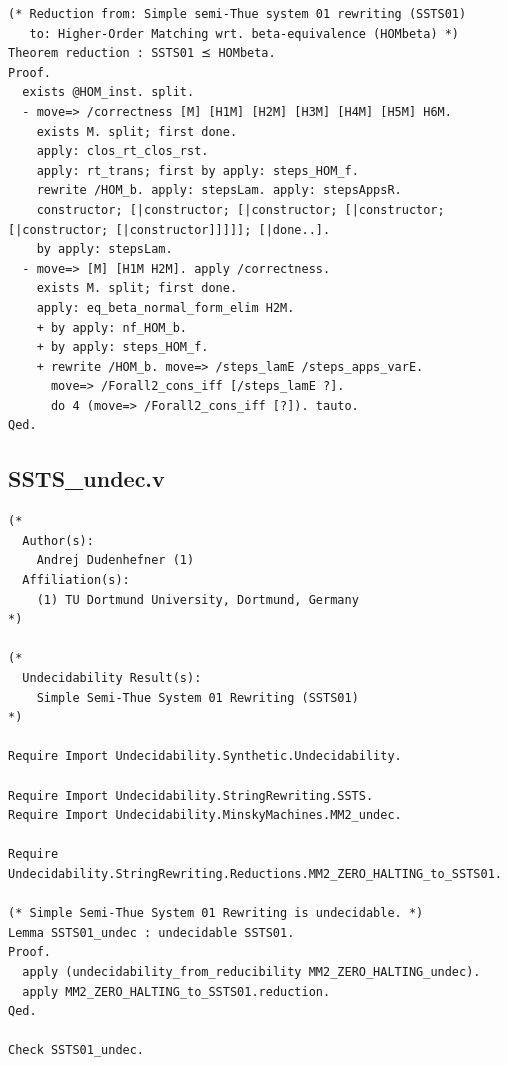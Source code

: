 \begin{lstlisting}
(* Reduction from: Simple semi-Thue system 01 rewriting (SSTS01)
   to: Higher-Order Matching wrt. beta-equivalence (HOMbeta) *)
Theorem reduction : SSTS01 ⪯ HOMbeta.
Proof.
  exists @HOM_inst. split.
  - move=> /correctness [M] [H1M] [H2M] [H3M] [H4M] [H5M] H6M.
    exists M. split; first done.
    apply: clos_rt_clos_rst.
    apply: rt_trans; first by apply: steps_HOM_f.
    rewrite /HOM_b. apply: stepsLam. apply: stepsAppsR.
    constructor; [|constructor; [|constructor; [|constructor; [|constructor; [|constructor]]]]]; [|done..].
    by apply: stepsLam.
  - move=> [M] [H1M H2M]. apply /correctness.
    exists M. split; first done.
    apply: eq_beta_normal_form_elim H2M.
    + by apply: nf_HOM_b.
    + by apply: steps_HOM_f.
    + rewrite /HOM_b. move=> /steps_lamE /steps_apps_varE.
      move=> /Forall2_cons_iff [/steps_lamE ?].
      do 4 (move=> /Forall2_cons_iff [?]). tauto.
Qed.

\end{lstlisting}

\subsection*{SSTS\_undec.v}
\begin{lstlisting}
(*
  Author(s):
    Andrej Dudenhefner (1)
  Affiliation(s):
    (1) TU Dortmund University, Dortmund, Germany
*)

(*
  Undecidability Result(s):
    Simple Semi-Thue System 01 Rewriting (SSTS01)
*)

Require Import Undecidability.Synthetic.Undecidability.

Require Import Undecidability.StringRewriting.SSTS.
Require Import Undecidability.MinskyMachines.MM2_undec.

Require Undecidability.StringRewriting.Reductions.MM2_ZERO_HALTING_to_SSTS01.

(* Simple Semi-Thue System 01 Rewriting is undecidable. *)
Lemma SSTS01_undec : undecidable SSTS01.
Proof.
  apply (undecidability_from_reducibility MM2_ZERO_HALTING_undec).
  apply MM2_ZERO_HALTING_to_SSTS01.reduction.
Qed.

Check SSTS01_undec.

\end{lstlisting}


